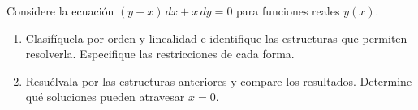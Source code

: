 Considere la ecuación $(y-x)\,dx+x\,dy=0$ para funciones reales $y(x)$.

\begin{enumerate}[label=(\alph*),ref=\alph*,leftmargin=*]
\item Clasifíquela por orden y linealidad e identifique las estructuras que permiten resolverla. Especifique las restricciones de cada forma.
\item Resuélvala por las estructuras anteriores y compare los resultados. Determine qué soluciones pueden atravesar $x=0$.
\end{enumerate}
